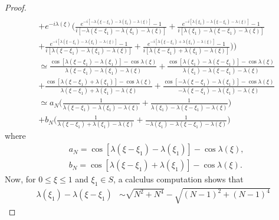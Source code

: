 \documentclass[12pt,reqno]{amsart}
\numberwithin{equation}{section}  %
\begin{document}
\begin{proof}
\begin{equation}
\begin{split}
  \\
  & + e^{-i \lambda(\xi)}\bigg ( \frac{e^{-i[-\lambda(\xi - \xi_{1}) - \lambda(\xi_{1}) - \lambda(\xi)]} - 1}{i[-\lambda(\xi - \xi_{1}) - \lambda(\xi_{1}) - \lambda(\xi)]} + 
  \frac{e^{-i[\lambda(\xi_{1}) - \lambda(\xi - \xi_{1}) - \lambda(\xi)]} - 1}{i[\lambda(\xi_{1}) - \lambda(\xi - \xi_{1}) - \lambda(\xi)]} 
  \\
  & +  \frac{e^{-i[\lambda(\xi - \xi_{1}) - \lambda(\xi_{1}) - \lambda(\xi)]} - 1}{i[\lambda(\xi - \xi_{1}) - \lambda(\xi_{1}) - \lambda(\xi)]} + \frac{e^{-i[\lambda(\xi - \xi_{1}) + \lambda(\xi_{1}) - \lambda(\xi)]} - 1}{i[\lambda(\xi - \xi_{1}) + \lambda(\xi_{1}) - \lambda(\xi)]} \bigg ) 
  \bigg )  
  \\
  & \simeq \frac{\cos[\lambda(\xi - \xi_{1}) - \lambda(\xi_{1})] - \cos \lambda(\xi)}{\lambda(\xi - \xi_{1}) - \lambda(\xi_{1}) - \lambda(\xi)} + \frac{\cos[\lambda(\xi_{1}) - \lambda(\xi - \xi_{1})] - \cos \lambda(\xi)}{\lambda(\xi_{1}) - \lambda(\xi - \xi_{1}) - \lambda(\xi)} 
  \\
  & + \frac{\cos[\lambda(\xi - \xi_{1}) + \lambda(\xi_{1})] - \cos \lambda(\xi)}{\lambda(\xi - \xi_{1}) + \lambda(\xi_{1}) - \lambda(\xi)} + \frac{\cos[-\lambda(\xi - \xi_{1}) - \lambda(\xi_{1})] - \cos \lambda(\xi)}{-\lambda(\xi - \xi_{1}) - \lambda(\xi_{1}) - \lambda(\xi)}
  \\
  & \simeq a_{N} \bigg ( \frac{1}{\lambda(\xi - \xi_{1}) - \lambda(\xi_{1}) - \lambda(\xi)} + \frac{1}{\lambda(\xi_{1}) - \lambda(\xi - \xi_{1}) - \lambda(\xi)} \bigg )
  \\
  & + b_{N} \bigg ( \frac{1}{\lambda(\xi - \xi_{1}) + \lambda(\xi_{1}) - \lambda(\xi)} + \frac{1}{-\lambda(\xi_{1}) - \lambda(\xi - \xi_{1}) - \lambda(\xi)} 
  \bigg ) 
\end{split}
\end{equation}
where
%
%
\begin{equation*}
\begin{split}
  & a_{N} =   \cos[\lambda(\xi - \xi_{1}) - \lambda(\xi_{1})] - \cos \lambda(\xi),
  \\
  & b_{N} =  \cos[\lambda(\xi - \xi_{1}) + \lambda(\xi_{1})] - \cos \lambda(\xi).
\end{split}
\end{equation*}
Now, for $0 \le \xi \le 1$ and $\xi_{1} \in S$, a calculus computation shows that
%
%
\begin{equation*}
\begin{split}
\lambda(\xi_{1}) - \lambda(\xi - \xi_{1})
 & \sim \sqrt{N^{2} + N^{4}} - \sqrt{(N-1)^{2} + (N-1)^{4}} 

\end{split}
\end{equation*}
\end{proof}
\end{document}
